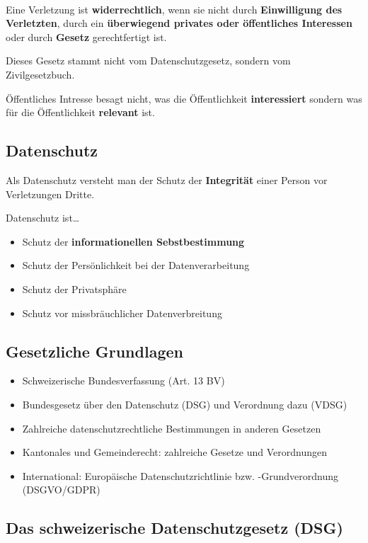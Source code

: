 \mbox{}\\
Eine Verletzung ist \textbf{widerrechtlich}, wenn sie nicht durch
\textbf{Einwilligung des Verletzten}, durch ein \textbf{überwiegend privates
oder öffentliches Interessen} oder durch \textbf{Gesetz} gerechtfertigt ist.


Dieses Gesetz stammt nicht vom Datenschutzgesetz, sondern vom
Zivilgesetzbuch.

Öffentliches Intresse besagt nicht, was die Öffentlichkeit
\textbf{interessiert} sondern was für die Öffentlichkeit
\textbf{relevant} ist.


\subsection{Datenschutz}
Als Datenschutz versteht man der Schutz der \textbf{Integrität} einer
Person vor Verletzungen Dritte.

Datenschutz ist\ldots{}

\begin{itemize}
	\tightlist
	\item Schutz der \textbf{informationellen Sebstbestimmung}
	\item Schutz der Persönlichkeit bei der Datenverarbeitung
	\item Schutz der Privatsphäre
	\item Schutz vor missbräuchlicher Datenverbreitung
\end{itemize}


\subsection{Gesetzliche Grundlagen}

\begin{itemize}
	\tightlist
	\item Schweizerische Bundesverfassung (Art. 13 BV)
	\item Bundesgesetz über den Datenschutz (DSG) und Verordnung dazu (VDSG)
	\item Zahlreiche datenschutzrechtliche Bestimmungen in anderen Gesetzen
	\item Kantonales und Gemeinderecht: zahlreiche Gesetze und Verordnungen
	\item International: Europäische Datenschutzrichtlinie bzw. -Grundverordnung
	(DSGVO/GDPR)
\end{itemize}

\subsection{Das schweizerische Datenschutzgesetz (DSG)}

